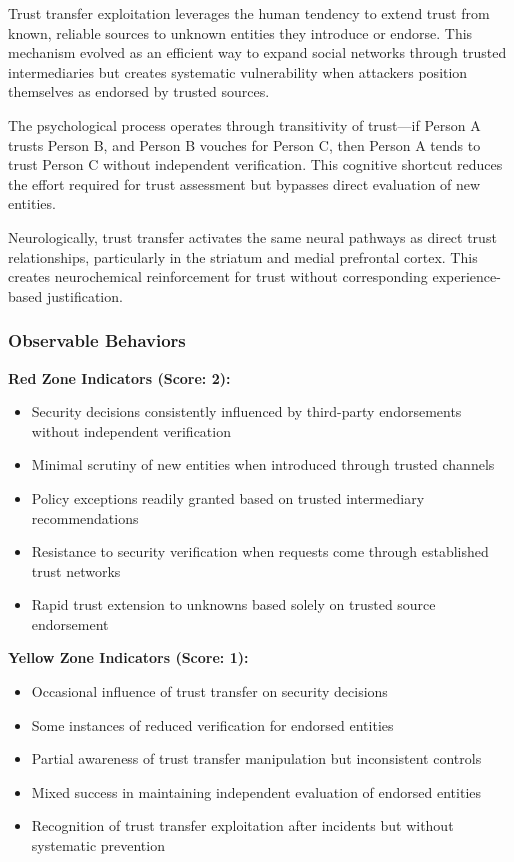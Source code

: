 \documentclass[11pt,a4paper]{article}
\begin{document}
Trust transfer exploitation leverages the human tendency to extend trust from known, reliable sources to unknown entities they introduce or endorse. This mechanism evolved as an efficient way to expand social networks through trusted intermediaries but creates systematic vulnerability when attackers position themselves as endorsed by trusted sources\cite{rotter1967}.

The psychological process operates through transitivity of trust—if Person A trusts Person B, and Person B vouches for Person C, then Person A tends to trust Person C without independent verification\cite{golbeck2006}. This cognitive shortcut reduces the effort required for trust assessment but bypasses direct evaluation of new entities.

Neurologically, trust transfer activates the same neural pathways as direct trust relationships, particularly in the striatum and medial prefrontal cortex\cite{krueger2007}. This creates neurochemical reinforcement for trust without corresponding experience-based justification.

\subsubsection{Observable Behaviors}

\textbf{Red Zone Indicators (Score: 2):}
\begin{itemize}
\item Security decisions consistently influenced by third-party endorsements without independent verification
\item Minimal scrutiny of new entities when introduced through trusted channels
\item Policy exceptions readily granted based on trusted intermediary recommendations
\item Resistance to security verification when requests come through established trust networks
\item Rapid trust extension to unknowns based solely on trusted source endorsement
\end{itemize}

\textbf{Yellow Zone Indicators (Score: 1):}
\begin{itemize}
\item Occasional influence of trust transfer on security decisions
\item Some instances of reduced verification for endorsed entities
\item Partial awareness of trust transfer manipulation but inconsistent controls
\item Mixed success in maintaining independent evaluation of endorsed entities
\item Recognition of trust transfer exploitation after incidents but without systematic prevention
\end{itemize}
\end{document}
